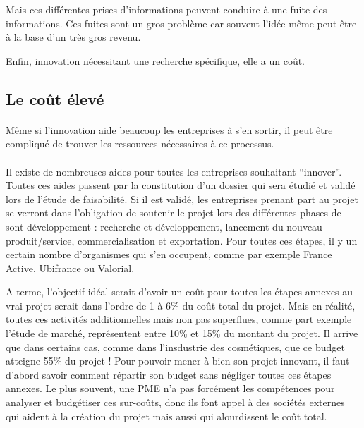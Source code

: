 \documentclass[a4paper,12pt]{report}
\begin{document}
		Mais ces différentes prises d’informations peuvent conduire à une fuite des informations. Ces fuites sont un gros problème car souvent l’idée même peut être à la base d’un très gros revenu.
		
		Enfin, innovation nécessitant une recherche spécifique, elle a un coût. 
		
			
		\subsection{Le coût élevé}
		\paragraph{}Même si l'innovation aide beaucoup les entreprises à s'en sortir, il peut être compliqué de trouver les ressources nécessaires à ce processus.
		
		\paragraph{}Il existe de nombreuses aides pour toutes les entreprises souhaitant “innover”. Toutes ces aides passent par la constitution d’un dossier qui sera étudié et validé lors de l’étude de faisabilité. Si il est validé, les entreprises prenant part au projet se verront dans l’obligation de soutenir le projet lors des différentes phases de sont développement : recherche et développement, lancement du nouveau produit/service, commercialisation et exportation. Pour toutes ces étapes, il y un certain nombre d’organismes qui s’en occupent, comme par exemple France Active, Ubifrance ou Valorial\cite{AidesInnovation}. 
		
		A terme, l’objectif idéal serait d’avoir un coût pour toutes les étapes annexes au vrai projet serait dans l’ordre de 1 à 6\% du coût total du projet. Mais en réalité, toutes ces activités additionnelles mais non pas superflues, comme part exemple l’étude de marché, représentent entre 10\% et 15\% du montant du projet. Il arrive que dans certains cas, comme dans l’insdustrie des cosmétiques, que ce budget atteigne 55\% du projet ! Pour pouvoir mener à bien son projet innovant, il faut d’abord savoir comment répartir son budget sans négliger toutes ces étapes annexes. Le plus souvent, une PME n’a pas forcément les compétences pour analyser et budgétiser ces sur-coûts, donc ils font appel à des sociétés externes qui aident à la création du projet mais aussi qui alourdissent le coût total.
		
\end{document}
